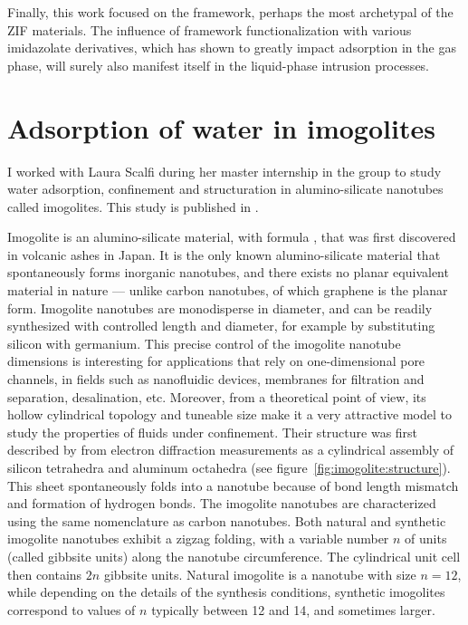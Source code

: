 \documentclass[thesis]{subfiles}
\begin{document}
Finally, this work focused on the  framework, perhaps the most archetypal
of the ZIF materials. The influence of framework functionalization with various
imidazolate derivatives, which has shown to greatly impact adsorption in the gas
phase, will surely also manifest itself in the liquid-phase intrusion processes.

\newpage
\section{Adsorption of water in imogolites}

I worked with Laura Scalfi during her master internship in the group to study
water adsorption, confinement and structuration in alumino-silicate nanotubes
called imogolites. This study is published in
\cite{Scalfi2018}.

Imogolite is an alumino-silicate material, with formula , that
was first discovered in volcanic ashes in Japan\cite{Yoshinaga1962}. It is the
only known alumino-silicate material that spontaneously forms inorganic
nanotubes, and there exists no planar equivalent material in nature --- unlike
carbon nanotubes, of which graphene is the planar form. Imogolite nanotubes are
monodisperse in diameter, and can be readily synthesized with controlled length
and diameter, for example by substituting silicon with
germanium\cite{Amara2013}. This precise control of the imogolite nanotube
dimensions is interesting for applications that rely on one-dimensional pore
channels, in fields such as nanofluidic devices, membranes for filtration and
separation, desalination, etc. Moreover, from a theoretical point of view, its
hollow cylindrical topology and tuneable size make it a very attractive model to
study the properties of fluids under confinement. Their structure was first
described by \citeauthor{Cradwick1972}\cite{Cradwick1972} from electron
diffraction measurements as a cylindrical assembly of silicon tetrahedra and
aluminum octahedra (see figure~\ref{fig:imogolite:structure}). This sheet
spontaneously folds into a nanotube because of bond length mismatch and
formation of hydrogen bonds\cite{Lee2011,Gonzalez2014}. The imogolite nanotubes
are characterized using the same nomenclature as carbon nanotubes. Both natural
and synthetic imogolite nanotubes exhibit a zigzag folding, with a variable
number $n$ of  units (called gibbsite units) along the
nanotube circumference. The cylindrical unit cell then contains $2n$ gibbsite
units. Natural imogolite is a nanotube with size $n=12$, while depending on the
details of the synthesis conditions, synthetic imogolites correspond to values
of $n$ typically between 12 and 14, and sometimes larger.
\end{document}
